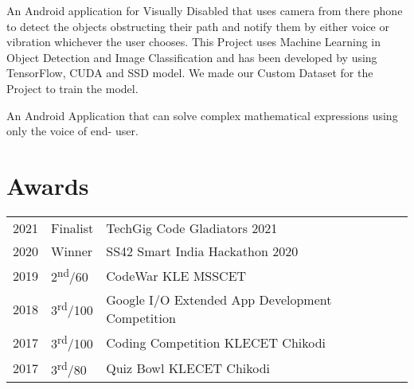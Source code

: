 \documentclass[]{deedy-resume-openfont}
\begin{document}
\begin{minipage}[t]{0.66\textwidth}
An Android application for Visually Disabled that uses camera from there phone to detect the objects obstructing
their path and notify them by either voice or vibration whichever the user chooses. This Project uses
Machine Learning in Object Detection and Image Classification and has been developed by using
TensorFlow, CUDA and SSD model. We made our Custom Dataset for the Project to train the model.
\sectionsep

An Android Application that can solve complex mathematical expressions using only the voice of end-
user.
\sectionsep


\section{Awards} 
\begin{tabular}{rll}
2021	     & Finalist  & TechGig Code Gladiators 2021\\
2020	     & Winner  & SS42 Smart India Hackathon 2020\\
2019	     & 2\textsuperscript{nd}/60  & CodeWar KLE MSSCET \\
2018     & 3\textsuperscript{rd}/100 & Google I/O Extended App Development Competition  \\
2017     & 3\textsuperscript{rd}/100 & Coding Competition KLECET Chikodi \\
2017     & 3\textsuperscript{rd}/80 & Quiz Bowl KLECET Chikodi \\
\end{tabular}
\sectionsep

\end{minipage} 
\end{document}
